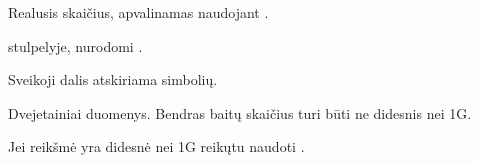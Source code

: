 \documentclass[letterpaper,10pt,lithuanian]{sphinxmanual}
\begin{document}

\begin{fulllineitems}
\label{\detokenize{tipai:type.number}}
\pysigstartsignatures
{}
\pysigstopsignatures
\sphinxAtStartPar
Realusis skaičius, apvalinamas naudojant .

\sphinxAtStartPar
{\hyperref[\detokenize{dimensijos:property.ref}]{}} stulpelyje, nurodomi {\hyperref[\detokenize{vienetai:matavimo-vienetai}]{}}.

\sphinxAtStartPar
Sveikoji dalis atskiriama  simbolių.

\end{fulllineitems}


\begin{fulllineitems}
\label{\detokenize{tipai:type.binary}}
\pysigstartsignatures
{}
\pysigstopsignatures
\sphinxAtStartPar
Dvejetainiai duomenys. Bendras baitų skaičius turi būti ne didesnis nei 1G.

\sphinxAtStartPar
Jei reikšmė yra didesnė nei 1G reikųtu naudoti {\hyperref[\detokenize{tipai:type.file}]{}}.

\end{fulllineitems}

\end{document}
